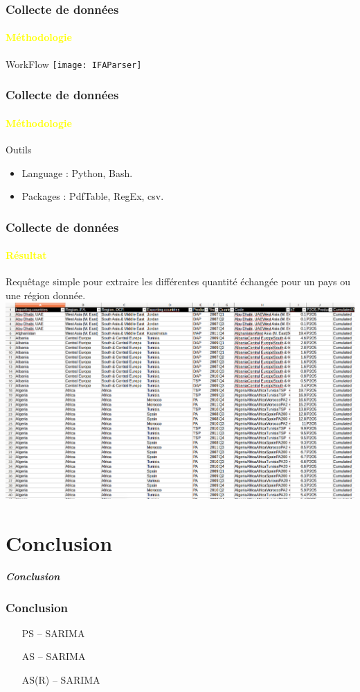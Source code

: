 \documentclass{beamer}
\begin{document}
\begin{frame}
  \frametitle{Collecte de données}
  \framesubtitle{\textbf{\textcolor{yellow}{Méthodologie}}}
	\begin{block}{WorkFlow}
    		\texttt{[image: IFAParser]}
	\end{block}
\end{frame}


\begin{frame}
  \frametitle{Collecte de données}
  \framesubtitle{\textbf{\textcolor{yellow}{Méthodologie}}}

  \begin{block}{Outils}
  	\begin{itemize}
    		\item Language : Python, Bash.
    		\item Packages : PdfTable, RegEx, csv.
  	\end{itemize}
  \end{block}
 \end{frame}
 
 \begin{frame}
  \frametitle{Collecte de données}
  \framesubtitle{\textbf{\textcolor{yellow}{Résultat}}}

  
  Requêtage simple pour extraire les différentes quantité échangée pour un pays ou une région donnée. \\
	\includegraphics[width=\textwidth, height=0.7\textheight, keepaspectratio]{IFAcsv}
  
 \end{frame}

\section{Conclusion}

\begin{frame}
	\begin{center}
		\Huge \textbf{\textit{Conclusion}}
	\end{center}
\end{frame}

\begin{frame}
  \frametitle{Conclusion}

  \begin{itemize}
    \item [PS] – SARIMA
    \item [AS] – SARIMA
    \item [AS(R)] – SARIMA
  \end{itemize}
\end{frame}
\end{document}
